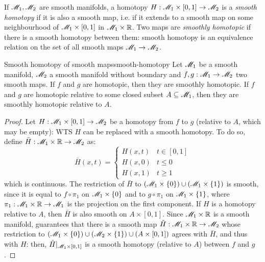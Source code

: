 If $ \mathscr{M}_1 , \mathscr{M}_2 $ are smooth manifolds, a homotopy $ H : \mathscr{M}_1 \times [0,1] \rightarrow \mathscr{M}_2 $ is a \emph{smooth homotopy} if it is also a smooth map, i.e. if it extends to a smooth map on some neighbourhood of $ \mathscr{M}_1 \times [0,1] $ in $ \mathscr{M}_1 \times \mathbb{R} $. Two maps are \emph{smoothly homotopic} if there is a smooth homotopy between them: smooth homotopy is an equivalence relation on the set of all smooth maps $ \mathscr{M}_1 \rightarrow \mathscr{M}_2 $.

\begin{proposition}{Smooth homotopy of smooth maps}{smooth-homotopy}
  Let $ \mathscr{M}_1 $ be a smooth manifold, $ \mathscr{M}_2 $ a smooth manifold without boundary and $ f,g : \mathscr{M}_1 \rightarrow \mathscr{M}_2 $ two smooth maps. If $ f $ and $ g $ are homotopic, then they are smoothly homotopic. If $ f $ and $ g $ are homotopic relative to some closed subset $ A \subseteq \mathscr{M}_1 $, then they are smoothly homotopic relative to $ A $.
\end{proposition}

\begin{proofbox}
  \begin{proof}
    Let $ H : \mathscr{M}_1 \times [0,1] \rightarrow \mathscr{M}_2 $ be a homotopy from $ f $ to $ g $ (relative to $ A $, which may be empty): WTS $ H $ can be replaced with a smooth homotopy. To do so, define $ \bar{H} : \mathscr{M}_1 \times \mathbb{R} \rightarrow \mathscr{M}_2 $ as:
    \begin{equation*}
      \bar{H}(x,t) =
      \begin{cases}
        H(x,t) & t \in [0,1] \\
        H(x,0) & t \leq 0 \\
        H(x,1) & t \geq 1
      \end{cases}
    \end{equation*}
    which is continuous. The restriction of $ \bar{H} $ to $ (\mathscr{M}_1 \times \{0\}) \cup (\mathscr{M}_1 \times \{1\}) $ is smooth, since it is equal to $ f \circ \pi_1 $ on $ \mathscr{M}_1 \times \{0\} $ and to $ g \circ \pi_1 $ on $ \mathscr{M}_1 \times \{1\} $, where $ \pi_1 : \mathscr{M}_1 \times \mathbb{R} \rightarrow \mathscr{M}_1 $ is the projection on the first component. If $ H $ is a homotopy relative to $ A $, then $ \bar{H} $ is also smooth on $ A \times [0,1] $. Since $ \mathscr{M}_1 \times \mathbb{R} $ is a smooth manifold,  guarantees that there is a smooth map $ \tilde{H} : \mathscr{M}_1 \times \mathbb{R} \rightarrow \mathscr{M}_2 $ whose restriction to $ (\mathscr{M}_1 \times \{0\}) \cup (\mathscr{M}_2 \times \{1\}) \cup (A \times [0,1]) $ agrees with $ \bar{H} $, and thus with $ H $: then, $ \tilde{H}\vert_{\mathscr{M}_1 \times [0,1]} $ is a smooth homotopy (relative to $ A $) between $ f $ and $ g $.
  \end{proof}
\end{proofbox}

